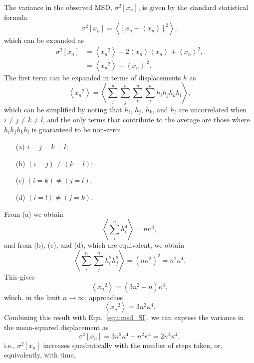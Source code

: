 \documentclass[reprint,superscriptaddress,nobibnotes,amsmath,amssymb,aps,prx,hidelinks,linenumbers]{revtex4-2}
\newcommand{\oMSDn}{\ensuremath{x_n}}
\newcommand{\moMSDn}{\ensuremath{\left<\oMSDn\right>}}
\newcommand{\var}[1]{\ensuremath{\sigma^2[#1]}}
\begin{document}
The variance in the observed MSD, $\var{\oMSDn}$, is given by the standard statistical formula
\begin{equation}
    \var{\oMSDn} = \left<{\left[\oMSDn - \moMSDn\right]}^2\right>,
\end{equation}
which can be expanded as
\begin{equation}
    \begin{aligned}
        \var{\oMSDn} &= \left<\oMSDn^2\right> - 2\moMSDn\left<\oMSDn\right> + \moMSDn^2,\\
                     &= \left<\oMSDn^2\right> - \moMSDn^{\,2}.
    \end{aligned}
\end{equation}
The first term can be expanded in terms of displacements $h$ as
\begin{equation}
  \left<\oMSDn^2\right> = \left<\sum_i^n\sum_j^n\sum_k^n\sum_l^n h_i h_j h_k h_l\right>,
  \label{equ:big_av}
\end{equation}
which can be simplified by noting that $h_i$, $h_j$, $h_k$, and $h_l$ are uncorrelated when $i \neq j \neq k \neq l$, and the only terms that contribute to the average are those where $h_ih_jh_kh_l$ is guaranteed to be non-zero:
\begin{itemize}
    \item[(a)] $i = j = k = l$;
    \item[(b)] $(i = j) \neq (k = l)$;
    \item[(c)] $(i = k) \neq (j = l)$;
    \item[(d)] $(i = l) \neq (j = k)$. 
\end{itemize}
From (a) we obtain
\begin{equation}
    \left<\sum_i^nh_i^4\right> = n\kappa^4,
\end{equation}
and from (b), (c), and (d), which are equivalent, we obtain
\begin{equation}
    \left<\sum_i^n\sum_j^nh_i^2h_j^2\right> = (n\kappa^2)^2 = n^2\kappa^4.
\end{equation}
This gives
\begin{equation}
    \left<\oMSDn^2\right> = (3n^2 + n)\kappa^4,
\end{equation}
which, in the limit $n \to \infty$, approaches
\begin{equation}
    \left<\oMSDn^2\right> = 3n^2\kappa^4.
    \label{equ:infty}
\end{equation}
Combining this result with Eqn.~\ref{equ:msd_SI}, we can express the variance in the mean-squared displacement as
\begin{equation}
    \var{\oMSDn} = 3n^2\kappa^4 - n^2\kappa^4 = 2n^2\kappa^4,
    \label{equ:varmsd}
\end{equation}
i.e., $\var{\oMSDn}$ increases quadratically with the number of steps taken, or, equivalently, with time.
\end{document}
